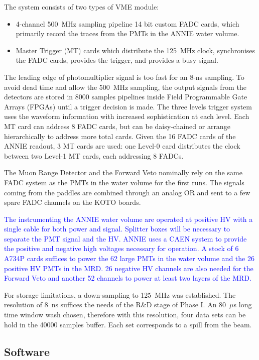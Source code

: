 The system consists of two types of VME module:
\begin{itemize}
  \item 4-channel 500~MHz sampling pipeline 14 bit custom FADC cards, which primarily record %
    the traces from the PMTs in the ANNIE water volume.
  \item Master Trigger (MT) cards which distribute the 125~MHz clock, synchronises the FADC %
    cards, provides the trigger, and provides a busy signal.
\end{itemize}

The leading edge of photomultiplier signal is too fast for an 8-ns sampling.
To avoid dead time and allow the 500~MHz sampling, the output signals from the detectors %
are stored in 8000 samples pipelines inside Field Programmable Gate Arrays (FPGAs) until %
a trigger decision is made.
The three levels trigger system uses the waveform information with increased %
sophistication at each level.
Each MT card can address 8 FADC cards, but can be daisy-chained or arrange hierarchically to %
address more total cards.
Given the 16 FADC cards of the ANNIE readout, 3 MT cards are used: %
one Level-0 card distributes the clock between two Level-1 MT cards, each addressing 8 FADCs.

The Muon Range Detector and the Forward Veto nominally rely on the same FADC system as %
the PMTs in the water volume for the first runs.
The signals coming from the paddles are combined through an analog OR and sent to a %
few spare FADC channels on the KOTO boards. 

\textcolor{blue}{
The instrumenting the ANNIE water volume are operated at positive HV with a %
single cable for both power and signal.
Splitter boxes will be necessary to separate the PMT signal and the HV.
ANNIE uses a CAEN system to provide the positive and negative high voltages necessary for operation. 
A stock of 6 A734P cards suffices to power the 62 large PMTs in the water volume %
and the 26 positive HV PMTs in the MRD.
26 negative HV channels are also needed for the Forward Veto and another 52 channels to power %
at least two layers of the MRD.
}

For storage limitations, a down-sampling to 125~MHz was established.
The resolution of 8~ns suffices the needs of the R\&D stage of Phase I.
An 80~$\mu$s long time window wash chosen, therefore with this resolution, four data sets can be %
hold in the 40000 samples buffer.
Each set corresponds to a spill from the beam.

\subsection{Software}

